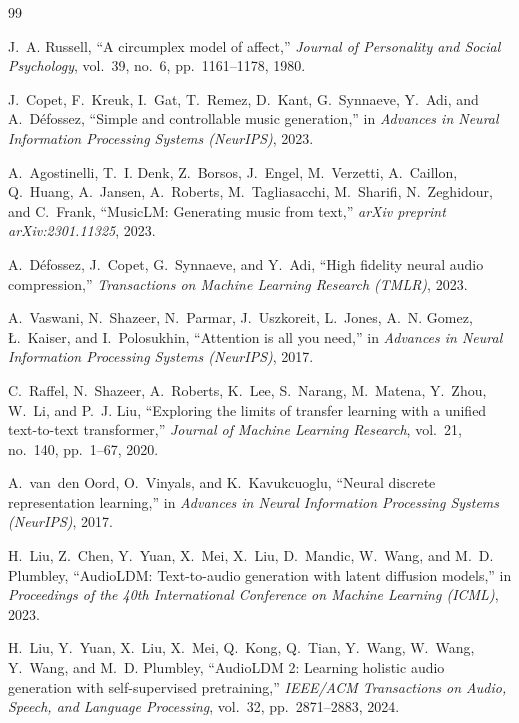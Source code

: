 \documentclass[11pt]{article}
\begin{document}
\begin{thebibliography}{99}

J.~A. Russell, ``A circumplex model of affect,'' \emph{Journal of Personality and Social Psychology}, vol.~39, no.~6, pp.~1161--1178, 1980.

J.~Copet, F.~Kreuk, I.~Gat, T.~Remez, D.~Kant, G.~Synnaeve, Y.~Adi, and A.~D\'efossez, ``Simple and controllable music generation,'' in \emph{Advances in Neural Information Processing Systems (NeurIPS)}, 2023.

A.~Agostinelli, T.~I. Denk, Z.~Borsos, J.~Engel, M.~Verzetti, A.~Caillon, Q.~Huang, A.~Jansen, A.~Roberts, M.~Tagliasacchi, M.~Sharifi, N.~Zeghidour, and C.~Frank, ``MusicLM: Generating music from text,'' \emph{arXiv preprint arXiv:2301.11325}, 2023.

A.~D\'efossez, J.~Copet, G.~Synnaeve, and Y.~Adi, ``High fidelity neural audio compression,'' \emph{Transactions on Machine Learning Research (TMLR)}, 2023.

A.~Vaswani, N.~Shazeer, N.~Parmar, J.~Uszkoreit, L.~Jones, A.~N. Gomez, {\L}.~Kaiser, and I.~Polosukhin, ``Attention is all you need,'' in \emph{Advances in Neural Information Processing Systems (NeurIPS)}, 2017.

C.~Raffel, N.~Shazeer, A.~Roberts, K.~Lee, S.~Narang, M.~Matena, Y.~Zhou, W.~Li, and P.~J. Liu, ``Exploring the limits of transfer learning with a unified text-to-text transformer,'' \emph{Journal of Machine Learning Research}, vol.~21, no.~140, pp.~1--67, 2020.

A.~van~den Oord, O.~Vinyals, and K.~Kavukcuoglu, ``Neural discrete representation learning,'' in \emph{Advances in Neural Information Processing Systems (NeurIPS)}, 2017.

H.~Liu, Z.~Chen, Y.~Yuan, X.~Mei, X.~Liu, D.~Mandic, W.~Wang, and M.~D. Plumbley, ``AudioLDM: Text-to-audio generation with latent diffusion models,'' in \emph{Proceedings of the 40th International Conference on Machine Learning (ICML)}, 2023.

H.~Liu, Y.~Yuan, X.~Liu, X.~Mei, Q.~Kong, Q.~Tian, Y.~Wang, W.~Wang, Y.~Wang, and M.~D. Plumbley, ``AudioLDM 2: Learning holistic audio generation with self-supervised pretraining,'' \emph{IEEE/ACM Transactions on Audio, Speech, and Language Processing}, vol.~32, pp.~2871--2883, 2024.


\end{thebibliography}
\end{document}
